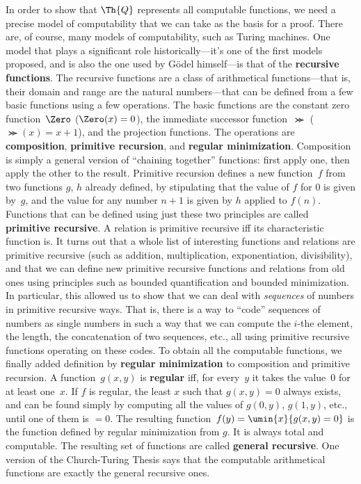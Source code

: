 In order to show that $\Th{Q}$ represents all computable functions, we
need a precise model of computability that we can take as the basis
for a proof.  There are, of course, many models of computability, such
as Turing machines. One model that plays a significant role
historically---it's one of the first models proposed, and is also the
one used by G\"odel himself---is that of the \textbf{recursive
functions}.  The recursive functions are a class of arithmetical
functions---that is, their domain and range are the natural
numbers---that can be defined from a few basic functions using a few
operations. The basic functions are the constant zero function~$\Zero$
($\Zero(x) = 0$), the immediate successor function~$\Succ$ ($\Succ(x)
= x+1$), and the projection functions. The operations are
\textbf{composition}, \textbf{primitive recursion}, and
\textbf{regular minimization}. Composition is simply a general version
of ``chaining together'' functions: first apply one, then apply the
other to the result. Primitive recursion defines a new function~$f$
from two functions $g$, $h$ already defined, by stipulating that the
value of $f$ for $0$ is given by~$g$, and the value for any number
$n+1$ is given by $h$ applied to $f(n)$. Functions that can be defined
using just these two principles are called \textbf{primitive
recursive}. A relation is primitive recursive iff its characteristic
function is. It turns out that a whole list of interesting functions
and relations are primitive recursive (such as addition,
multiplication, exponentiation, divisibility), and that we can define
new primitive recursive functions and relations from old ones using
principles such as bounded quantification and bounded minimization. In
particular, this allowed us to show that we can deal with
\emph{sequences} of numbers in primitive recursive ways. That is,
there is a way to ``code'' sequences of numbers as single numbers in
such a way that we can compute the $i$-the element, the length, the
concatenation of two sequences, etc., all using primitive recursive
functions operating on these codes.  To obtain all the computable
functions, we finally added definition by \textbf{regular
minimization} to composition and primitive recursion.  A
function~$g(x, y)$ is \textbf{regular} iff, for every~$y$ it takes the
value~$0$ for at least one~$x$. If $f$ is regular, the least $x$ such
that $g(x, y) = 0$ always exists, and can be found simply by computing
all the values of $g(0, y)$, $g(1, y)$, etc., until one of them is $=
0$. The resulting function~$f(y) = \umin{x}{g(x, y) = 0}$ is the
function defined by regular minimization from $g$. It is always total
and computable. The resulting set of functions are called
\textbf{general recursive}.  One version of the Church-Turing Thesis
says that the computable arithmetical functions are exactly the
general recursive ones.
